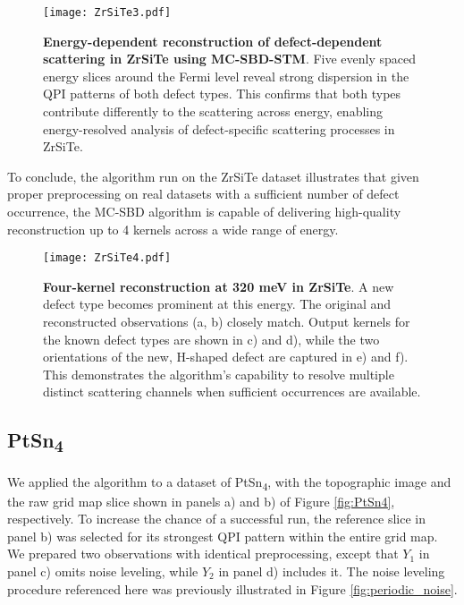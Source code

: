 \begin{figure}
	\texttt{[image: ZrSiTe3.pdf]} 
	\centering
	\caption[\textbf{Energy-dependent reconstruction of defect-dependent scattering in ZrSiTe using MC-SBD-STM}]{\textbf{Energy-dependent reconstruction of defect-dependent scattering in ZrSiTe using MC-SBD-STM}. Five evenly spaced energy slices around the Fermi level reveal strong dispersion in the QPI patterns of both defect types. This confirms that both types contribute differently to the scattering across energy, enabling energy-resolved analysis of defect-specific scattering processes in ZrSiTe.}
	\label{fig:ZrSiTe3}
\end{figure}

To conclude, the algorithm run on the ZrSiTe dataset illustrates that given proper preprocessing on real datasets with a sufficient number of defect occurrence, the \ac{MC-SBD} algorithm is capable of delivering high-quality reconstruction up to 4 kernels across a wide range of energy.

\begin{figure}
	\texttt{[image: ZrSiTe4.pdf]} 
	\centering
	\caption[\textbf{Four-kernel reconstruction at 320 meV in ZrSiTe}]{\textbf{Four-kernel reconstruction at 320 meV in ZrSiTe}. A new defect type becomes prominent at this energy. The original and reconstructed observations (a, b) closely match. Output kernels for the known defect types are shown in c) and d), while the two orientations of the new, H-shaped defect are captured in e) and f). This demonstrates the algorithm’s capability to resolve multiple distinct scattering channels when sufficient occurrences are available.}
	\label{fig:ZrSiTe4}
\end{figure}

\subsection{PtSn\textsubscript{4}}
We applied the algorithm to a dataset of PtSn\textsubscript{4}, with the topographic image and the raw grid map slice shown in panels a) and b) of Figure \ref{fig:PtSn4}, respectively. To increase the chance of a successful run, the reference slice in panel b) was selected for its strongest QPI pattern within the entire grid map. We prepared two observations with identical preprocessing, except that $Y_1$ in panel c) omits noise leveling, while $Y_2$ in panel d) includes it. The noise leveling procedure referenced here was previously illustrated in Figure \ref{fig:periodic_noise}.

